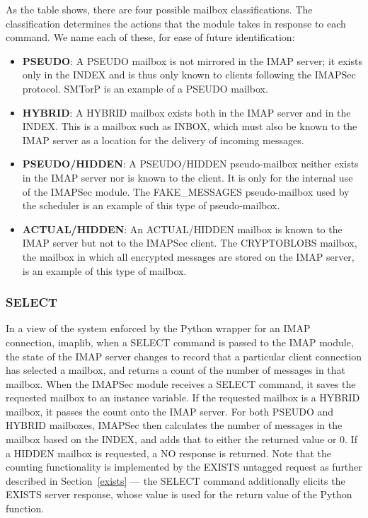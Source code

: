 \documentclass[pageno]{jpaper}
\newcommand{\project}{IMAPSec }
\begin{document}
\medskip

As the table shows, there are four possible mailbox classifications. The classification determines the actions that the module takes in response to each command. We name each of these, for ease of future identification:

\begin{itemize}

\item \textbf{PSEUDO}: A PSEUDO mailbox is not mirrored in the IMAP server; it exists only in the INDEX and is thus only known to clients following the \project protocol. SMTorP is an example of a PSEUDO mailbox.
\item \textbf{HYBRID}: A HYBRID mailbox exists both in the IMAP server and in the INDEX. This is a mailbox such as INBOX, which must also be known to the IMAP server as a location for the delivery of incoming messages.
\item \textbf{PSEUDO/HIDDEN}: A PSEUDO/HIDDEN pseudo-mailbox neither exists in the IMAP server nor is known to the client. It is only for the internal use of the \project module. The FAKE\_MESSAGES pseudo-mailbox used by the scheduler is an example of this type of pseudo-mailbox.
\item \textbf{ACTUAL/HIDDEN}: An ACTUAL/HIDDEN mailbox is known to the IMAP server but not to the \project client. The CRYPTOBLOBS mailbox, the mailbox in which all encrypted messages are stored on the IMAP server, is an example of this type of mailbox.

\end{itemize}


\subsubsection{SELECT}
\label{select}

In a view of the system enforced by the Python wrapper for an IMAP connection, imaplib, when a SELECT command is passed to the IMAP module, the state of the IMAP server changes to record that a particular client connection has selected a mailbox, and returns a count of the number of messages in that mailbox. When the \project module receives a SELECT command, it saves the requested mailbox to an instance variable. If the requested mailbox is a HYBRID mailbox, it passes the count onto the IMAP server. For both PSEUDO and HYBRID mailboxes, \project then calculates the number of messages in the mailbox based on the INDEX, and adds that to either the returned value or 0. If a HIDDEN mailbox is requested, a NO response is returned. Note that the counting functionality is implemented by the EXISTS untagged request as further described in Section~\ref{exists} \---- the SELECT command additionally elicits the EXISTS server response, whose value is used for the return value of the Python function.
\end{document}

